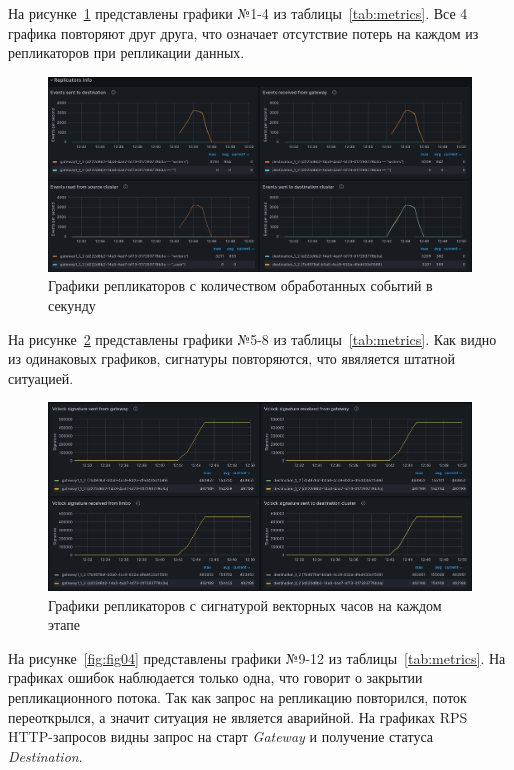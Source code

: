 На рисунке~\ref{fig:fig02} представлены графики №1-4 из таблицы~\ref{tab:metrics}. Все 4 графика повторяют
друг друга, что означает отсутствие потерь на каждом из репликаторов при репликации данных.

\begin{figure}
  \centering
  \includegraphics[scale=0.2]{assets/replicators_info_graph_1.jpeg}
  \caption{Графики репликаторов с количеством обработанных событий в секунду}
  \label{fig:fig02}
\end{figure}

На рисунке~\ref{fig:fig03} представлены графики №5-8 из таблицы~\ref{tab:metrics}. Как видно из одинаковых
графиков, сигнатуры повторяются, что явяляется штатной ситуацией.

\begin{figure}
  \centering
  \includegraphics[scale=0.2]{assets/replicators_info_graph_2.jpeg}
  \caption{Графики репликаторов с сигнатурой векторных часов на каждом этапе}
  \label{fig:fig03}
\end{figure}

На рисунке~\ref{fig:fig04} представлены графики №9-12 из таблицы~\ref{tab:metrics}. На графиках ошибок
наблюдается только одна, что говорит о закрытии репликационного потока. Так как запрос на репликацию
повторился, поток переоткрылся, а значит ситуация не является аварийной. На графиках RPS HTTP-запросов
видны запрос на старт \textit{Gateway} и получение статуса \textit{Destination}.

